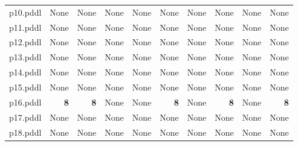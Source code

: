 \documentclass{article}
\begin{document}
\begin{tabular}{@{}lrrrrrrrrr@{}}
p10.pddl & \multicolumn{1}{|l|}{None} & \multicolumn{1}{|l|}{None} & \multicolumn{1}{|l|}{None} & \multicolumn{1}{|l|}{None} & \multicolumn{1}{|l|}{None} & \multicolumn{1}{|l|}{None} & \multicolumn{1}{|l|}{None} & \multicolumn{1}{|l|}{None} & \multicolumn{1}{|l|}{None} \\
p11.pddl & \multicolumn{1}{|l|}{None} & \multicolumn{1}{|l|}{None} & \multicolumn{1}{|l|}{None} & \multicolumn{1}{|l|}{None} & \multicolumn{1}{|l|}{None} & \multicolumn{1}{|l|}{None} & \multicolumn{1}{|l|}{None} & \multicolumn{1}{|l|}{None} & \multicolumn{1}{|l|}{None} \\
p12.pddl & \multicolumn{1}{|l|}{None} & \multicolumn{1}{|l|}{None} & \multicolumn{1}{|l|}{None} & \multicolumn{1}{|l|}{None} & \multicolumn{1}{|l|}{None} & \multicolumn{1}{|l|}{None} & \multicolumn{1}{|l|}{None} & \multicolumn{1}{|l|}{None} & \multicolumn{1}{|l|}{None} \\
p13.pddl & \multicolumn{1}{|l|}{None} & \multicolumn{1}{|l|}{None} & \multicolumn{1}{|l|}{None} & \multicolumn{1}{|l|}{None} & \multicolumn{1}{|l|}{None} & \multicolumn{1}{|l|}{None} & \multicolumn{1}{|l|}{None} & \multicolumn{1}{|l|}{None} & \multicolumn{1}{|l|}{None} \\
p14.pddl & \multicolumn{1}{|l|}{None} & \multicolumn{1}{|l|}{None} & \multicolumn{1}{|l|}{None} & \multicolumn{1}{|l|}{None} & \multicolumn{1}{|l|}{None} & \multicolumn{1}{|l|}{None} & \multicolumn{1}{|l|}{None} & \multicolumn{1}{|l|}{None} & \multicolumn{1}{|l|}{None} \\
p15.pddl & \multicolumn{1}{|l|}{None} & \multicolumn{1}{|l|}{None} & \multicolumn{1}{|l|}{None} & \multicolumn{1}{|l|}{None} & \multicolumn{1}{|l|}{None} & \multicolumn{1}{|l|}{None} & \multicolumn{1}{|l|}{None} & \multicolumn{1}{|l|}{None} & \multicolumn{1}{|l|}{None} \\
p16.pddl & \textbf{8} & \textbf{8} & \multicolumn{1}{|l|}{None} & \multicolumn{1}{|l|}{None} & \textbf{8} & \multicolumn{1}{|l|}{None} & \textbf{8} & \multicolumn{1}{|l|}{None} & \textbf{8} \\
p17.pddl & \multicolumn{1}{|l|}{None} & \multicolumn{1}{|l|}{None} & \multicolumn{1}{|l|}{None} & \multicolumn{1}{|l|}{None} & \multicolumn{1}{|l|}{None} & \multicolumn{1}{|l|}{None} & \multicolumn{1}{|l|}{None} & \multicolumn{1}{|l|}{None} & \multicolumn{1}{|l|}{None} \\
p18.pddl & \multicolumn{1}{|l|}{None} & \multicolumn{1}{|l|}{None} & \multicolumn{1}{|l|}{None} & \multicolumn{1}{|l|}{None} & \multicolumn{1}{|l|}{None} & \multicolumn{1}{|l|}{None} & \multicolumn{1}{|l|}{None} & \multicolumn{1}{|l|}{None} & \multicolumn{1}{|l|}{None} \\

\end{tabular}
\end{document}
